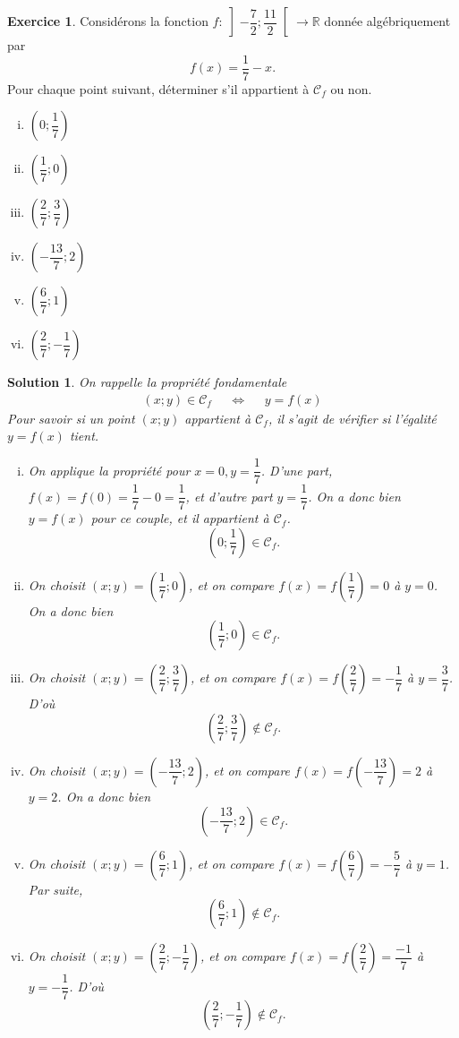 \documentclass[a4paper, 14pt]{extarticle}
\theoremstyle{plain}
\newtheorem*{sol}{Solution}
\theoremstyle{definition}
\newtheorem{ex}{Exercice}
\newcommand{\C}{\mathcal{C}}
\newcommand{\R}{\mathbb{R}}
\newif\ifsolutions
\newcommand{\exe}[2]{
		\begin{ex} #1  \end{ex}
		\begin{sol} #2 \end{sol}
	}
\newcommand{\exe}[2]{
		\begin{ex} #1  \end{ex}
	}
\begin{document}
\pagestyle{fancy}
\fancyhead[C]{\textbf{Fonctions 2 \ifsolutions -- Solutions  \fi}}
\fancyhead[R]{\today}


	\exe{
		Considérons la fonction $f: \left]{-}\dfrac72 ; \dfrac{11}2 \right[ \rightarrow\R$ donnée algébriquement par
			\[ f(x) = \dfrac17-x. \]
		Pour chaque point suivant, déterminer s'il appartient à $\C_f$ ou non.
		
		\begin{multicols}{2}
		\begin{enumerate}[i)]
			\item $\left(0; \dfrac17\right)$
			\item $\left(\dfrac17 ; 0\right)$
			\item $\left(\dfrac27 ; \dfrac37\right)$
			\item $\left(-\dfrac{13}7 ; 2\right)$
			\item $\left(\dfrac67 ; 1\right)$
			\item $\left(\dfrac27 ; -\dfrac17\right)$
		\end{enumerate}
		\end{multicols}
	
	}{
	On rappelle la propriété fondamentale
		\begin{align*}
			(x;y) \in \C_f && \iff && y = f(x)
		\end{align*}
	Pour savoir si un point $(x;y)$ appartient à $\C_f$, il s'agit de vérifier si l'égalité $y=f(x)$ tient.
	
		\begin{enumerate}[i)]
			\item On applique la propriété pour $x = 0, y= \dfrac17$.
			D'une part, $f(x) = f(0) = \dfrac17 - 0 = \dfrac17$, et d'autre part $y=\dfrac17$.
			On a donc bien $y=f(x)$ pour ce couple, et il appartient à $\C_f$.
				\[ \left(0; \dfrac17\right) \in \C_f. \]
			
			\item On choisit $(x;y) = \left(\dfrac17 ; 0\right)$, et on compare $f(x) = f\left(\dfrac17\right) = 0$ à $y=0$. 
			On a donc bien
				\[ \left(\dfrac17 ; 0\right) \in \C_f. \]
				
			\item On choisit $(x;y) = \left(\dfrac27 ; \dfrac37\right)$, et on compare $f(x) = f\left(\dfrac27\right) = -\dfrac17$ à $y=\dfrac37$. 
			D'où
				\[ \left(\dfrac27 ; \dfrac37\right) \not\in \C_f. \]
				
			\item On choisit $(x;y) = \left(-\dfrac{13}7 ; 2\right)$, et on compare $f(x) = f\left(-\dfrac{13}7\right) = 2$ à $y=2$. 
			On a donc bien
				\[ \left(-\dfrac{13}7 ; 2\right) \in \C_f. \]
			\item On choisit $(x;y) = \left(\dfrac67 ; 1\right)$, et on compare $f(x) = f\left(\dfrac67\right) = -\dfrac57$ à $y=1$. 
			Par suite,
				\[ \left(\dfrac67 ; 1\right) \not\in \C_f. \]
			\item On choisit $(x;y) = \left(\dfrac27 ; -\dfrac17\right)$, et on compare $f(x) = f\left(\dfrac27\right) = \dfrac{-1}7$ à $y=-\dfrac17$. 
			D'où
				\[ \left(\dfrac27 ; -\dfrac17\right) \not\in \C_f. \]
		\end{enumerate}
	
	}
\end{document}
